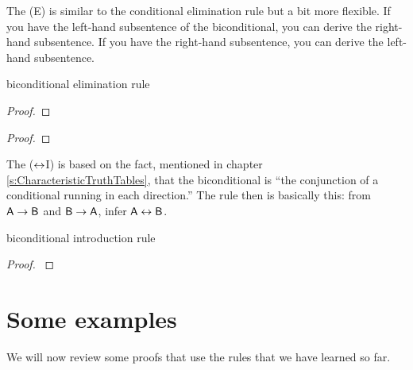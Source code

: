 The  ({\eiff}E) is similar to the conditional elimination rule but a bit more flexible. If you have the left-hand subsentence of the biconditional, you can derive the right-hand subsentence. If you have the right-hand subsentence, you can derive the left-hand subsentence.
\begin{factboxy}{biconditional elimination rule}\label{be-rule}
\begin{proof}
	 
\end{proof}

\begin{proof}
	 
\end{proof}
\end{factboxy}

The  ($\leftrightarrow$I) is based on the fact, mentioned in chapter \ref{s:CharacteristicTruthTables}, that the biconditional is ``the conjunction of a conditional running in each direction.'' The rule then is basically this: from $\mathsf{A} \rightarrow \mathsf{B}$ and $\mathsf{B} \rightarrow \mathsf{A}$, infer $\mathsf{A} \leftrightarrow \mathsf{B}$.

\begin{factboxy}{biconditional introduction rule}
\begin{proof}\label{eiff-I}
	 
\end{proof}
\end{factboxy}



\section{Some examples}

We will now review some proofs that use the rules that we have learned so far. 

